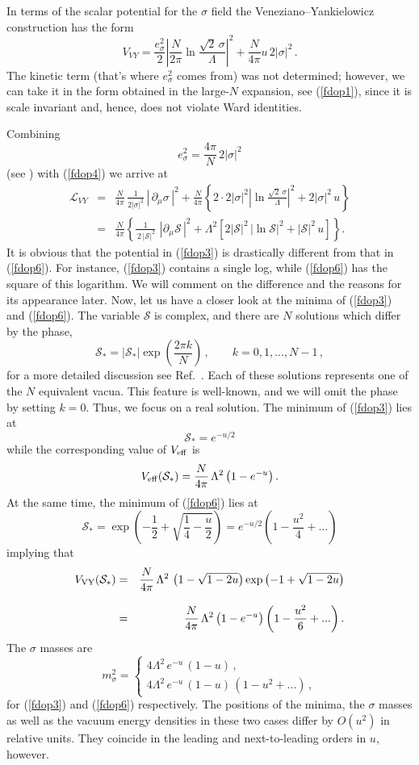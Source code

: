 \documentclass[epsfig,12pt]{article}
\def\beq{\begin{equation}}
\def\eeq{\end{equation}}
\def\beqn{\begin{eqnarray}}
\def\eeqn{\end{eqnarray}}
\newcommand{\cs}{{\mathcal S}}
\def\beqn{\begin{eqnarray}}
\def\eeqn{\end{eqnarray}}
\def\beq{\begin{equation}}
\def\eeq{\end{equation}}
\begin{document}
{In terms of the scalar potential for the $\sigma$ field
the Veneziano--Yankielowicz  construction has the form
\beq
V_{VY} = \frac{e^2_\sigma}{2} \left|\frac{N}{2\pi}
\ln\frac{\sqrt{2}\, \sigma}{\Lambda}\right|^2
+\frac{N}{4\pi} u\,2|\sigma|^2\,.
\label{fdop4}
\eeq
The kinetic term (that's where $e^2_\sigma$ comes from) was not determined; however, we can take
it in the form obtained in the large-$N$ expansion, see (\ref{fdop1}),
since it is scale invariant and, hence,  does not violate Ward identities.

Combining 
\beq
e^2_\sigma =\frac{4\pi}{N}\,2|\sigma|^2
\label{fdop5} 
\eeq
(see \cite{SYhet}) with (\ref{fdop4}) we arrive at
\beqn
{\mathcal L}_{VY} 
&=&\frac{N}{4\pi}\,\frac{1}{2|\sigma|^2}\,| \,  \partial_\mu\sigma \,|^2+
 \frac{N}{4\pi}
\left\{ 2\cdot 2|\sigma|^2
 \left|
\ln\frac{\sqrt{2}\, \sigma}{\Lambda}\right|^2
+2|\sigma|^2\, u\right\}
\nonumber\\[3mm]
&=& \frac{N}{4\pi}
\left\{
\frac{1}{\,2\, |\cs|^2}\,\,
 | \partial_\mu\cs \, |^2
 +\Lambda^2
 \left[2|\cs |^2\,\left|\ln \cs\right|^2 + |\cs|^2\,u
 \right]
 \right\}.
 \label{fdop6}
\eeqn
It is obvious that the potential in (\ref{fdop3})
is drastically different from that in (\ref{fdop6}). 
For instance, (\ref{fdop3}) contains a single log, while (\ref{fdop6}) has the square of this logarithm.
We will comment on the difference and the reasons for its appearance 
later. Now, let us have a closer look at the minima of
(\ref{fdop3}) and (\ref{fdop6}). The variable $\cs$ is complex, and there are $N$ solutions
which differ by the phase,
\beq
\cs_* = \left|\cs_* \right|\exp\left(\frac{2\pi k}{N}\right)\,,\qquad k = 0,1, ..., N-1\,,
\eeq
for a more detailed discussion see Ref.~\cite{Kos}.
Each of these solutions represents one of the $N$ equivalent vacua. 
This feature is well-known, and we will omit the phase by setting $k=0$.
Thus, we focus on a real solution.
The minimum of (\ref{fdop3}) lies at
 \beq
 \cs_* = e^{-u/2}
 \label{wdop1}
 \eeq
while the corresponding value of $V_{\rm eff}$ is
\beq
V_{\rm eff} (\cs_* ) = \frac{N}{4\pi}\,\Lambda^2 \left(1- e^{-u}
\right)  .
 \label{wdop2}
\eeq
At the same time, the minimum of (\ref{fdop6}) lies at
\beq
\cs_* = \exp\left(-\frac{1}{2} + \sqrt{\frac{1}{4}-\frac{u}{2}}\right) =  e^{-u/2}\left(1-\frac{u^2}{4} + ...
\right)
\label{wdop3}
\eeq
implying that 
\beqn
V_{\rm VY} (\cs_* )
&=&  \frac{N}{4\pi}\,\Lambda^2 \,\left({1} - \sqrt{{1}-2 {u}} \right)\exp\left(-{1} + \sqrt{{1}-2 {u}}\right)
\nonumber\\[3mm]
& =&
  \frac{N}{4\pi}\,\Lambda^2 \left(1- e^{-u}
\right) \left(1-\frac{u^2}{6}  + ...
\right) .
\label{wdop5}
\eeqn 
The $\sigma$ masses are
\beq
m_\sigma^2 = \left\{
\begin{array}{l}
4\Lambda^2\,e^{-u}\,(1-u)\,,\\[2mm]
4\Lambda^2\,e^{-u}\,(1-u)\,(1-u^2+...)\,,
\end{array}
\right.
\label{wdop4}
\eeq
for (\ref{fdop3}) and (\ref{fdop6}) respectively.
The positions of the minima, the $\sigma$ masses
as well as the vacuum energy densities in these two cases
differ by $O(u^2)$ in relative units. They coincide in the leading and next-to-leading orders in $u$, however.

}
\end{document}
